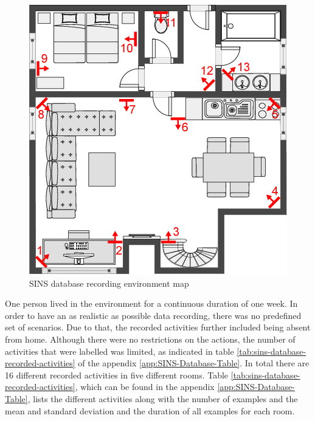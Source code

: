\begin{figure}[htbp]
	\centering
	\includegraphics[scale=0.35]{img/SINS_database_floor_map.png}
	\caption[SINS database recording environment map]{SINS database recording environment map\footnotemark}
	\label{fig:sins-database-floor-map}
\end{figure}
\noindent
One person lived in the environment for a continuous duration of one week. In order to have an as realistic as possible data recording, there was no predefined set of scenarios. Due to that, the recorded activities further included being absent from home. Although there were no restrictions on the actions, the number of activities that were labelled was limited, as indicated in table \ref{tab:sins-database-recorded-activities} of the appendix \ref{app:SINS-Database-Table}. In total there are 16 different recorded activities in five different rooms. Table \ref{tab:sins-database-recorded-activities}, which can be found in the appendix \ref{app:SINS-Database-Table}, lists the different activities along with the number of examples and the mean and standard deviation and the duration of all examples for each room.

